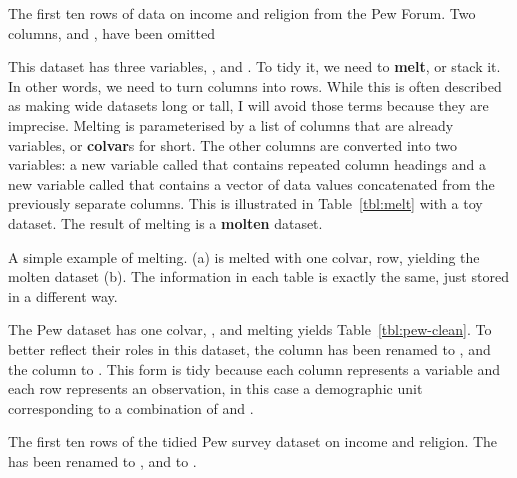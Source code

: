 \documentclass[article]{jss}
\begin{document}
\begin{table}[htbp]
  \centering
  
  \caption{The first ten rows of data on income and religion from the Pew Forum. Two columns,  and , have been omitted} 
  \label{tbl:pew-raw}
\end{table}

This dataset has three variables, ,  and . To tidy it, we need to \textbf{melt}, or stack it. In other words, we need to turn columns into rows. While this is often described as making wide datasets long or tall, I will avoid those terms because they are imprecise. Melting is parameterised by a list of columns that are already variables, or \textbf{colvar}s for short. The other columns are converted into two variables: a new variable called  that contains repeated column headings and a new variable called  that contains a vector of data values concatenated from the previously separate columns. This is illustrated in Table~\ref{tbl:melt} with a toy dataset. The result of melting is a \textbf{molten} dataset.

\begin{table}
  \centering
  \hspace{2em}%

  \caption{A simple example of melting. (a) is melted with one colvar, row, yielding the molten dataset (b). The information in each table is exactly the same, just stored in a different way.}
  \label{tbl:melt} 
\end{table}

The Pew dataset has one colvar, , and melting yields Table~\ref{tbl:pew-clean}. To better reflect their roles in this dataset, the  column has been renamed to , and the  column to . This form is tidy because each column represents a variable and each row represents an observation, in this case a demographic unit corresponding to a combination of  and .

\begin{table}[htbp]
  \centering
  
  \caption{The first ten rows of the tidied Pew survey dataset on income and religion. The  has been renamed to , and  to .}
  \label{tbl:pew-clean}
\end{table}
\end{document}
